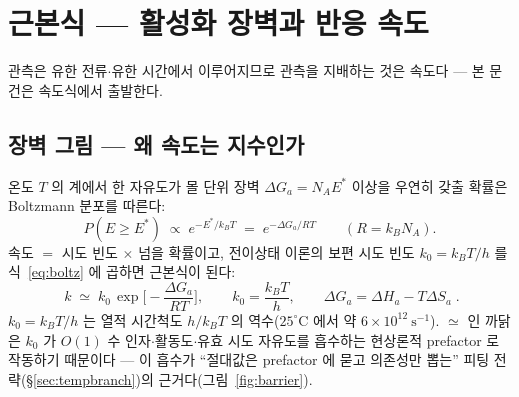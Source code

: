 \documentclass[11pt,a4paper]{article}
\begin{document}
\section{근본식 — 활성화 장벽과 반응 속도}\label{sec:rate}
관측은 유한 전류$\cdot$유한 시간에서 이루어지므로 관측을 지배하는 것은 속도다 — 본 문건은 속도식에서 출발한다.

\subsection{장벽 그림 — 왜 속도는 지수인가}
온도 $T$ 의 계에서 한 자유도가 몰 단위 장벽 $\Delta G_a=N_AE^*$ 이상을 우연히 갖출 확률은 Boltzmann 분포를 따른다:
\begin{equation}
P(E\ge E^*)\;\propto\;e^{-E^*/k_BT}
\;=\;e^{-\Delta G_a/RT}\qquad(R=k_BN_A).
\label{eq:boltz}
\end{equation}
속도 $=$ 시도 빈도 $\times$ 넘을 확률이고, 전이상태 이론의 보편 시도 빈도 $k_0=k_BT/h$ 를 식~\eqref{eq:boltz} 에 곱하면 \cite{eyring1935} 근본식이 된다:
\begin{equation}
\boxed{\;k\;\simeq\;k_0\,\exp\!\Big[-\frac{\Delta G_a}{RT}\Big],\qquad
k_0=\frac{k_BT}{h},\qquad \Delta G_a=\Delta H_a-T\Delta S_a\;.}
\label{eq:eyring}
\end{equation}
$k_0=k_BT/h$ 는 열적 시간척도 $h/k_BT$ 의 역수($25^\circ$C 에서 약 $6\times10^{12}\ \mathrm{s^{-1}}$). $\simeq$ 인 까닭은 $k_0$ 가 $O(1)$ 수 인자$\cdot$활동도$\cdot$유효 시도 자유도를 흡수하는 현상론적 prefactor 로 작동하기 때문이다 — 이 흡수가 ``절대값은 prefactor 에 묻고 의존성만 뽑는'' 피팅 전략(\S\ref{sec:tempbranch})의 근거다(그림~\ref{fig:barrier}).
\end{document}
